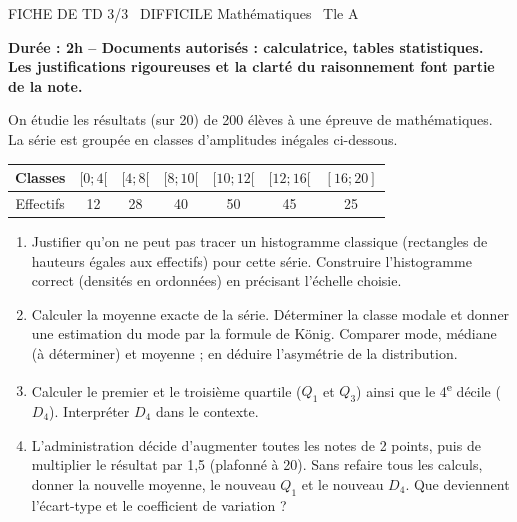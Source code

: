 \documentclass[11pt]{article}
\begin{document}
\begin{tcolorbox}[enhanced,colback=popink,colframe=popink,arc=10pt,boxrule=0pt,left=12pt,right=12pt,top=9pt,bottom=9pt]
{\color{white}\popxbold\small FICHE DE TD 3/3 \textbullet\ DIFFICILE \hfill Mathématiques \textbullet\ Tle A\par}
\end{tcolorbox}
\vspace{4pt}
\textbf{Durée : 2h -- Documents autorisés : calculatrice, tables statistiques. Les justifications rigoureuses et la clarté du raisonnement font partie de la note.}

\begin{exercice}
On étudie les résultats (sur 20) de 200 élèves à une épreuve de mathématiques. La série est groupée en classes d'amplitudes inégales ci-dessous.
\begin{center}
\begin{tabular}{|c|c|c|c|c|c|c|}
\hline
Classes & $[0; 4[$ & $[4; 8[$ & $[8; 10[$ & $[10; 12[$ & $[12; 16[$ & $[16; 20]$ \\
\hline
Effectifs & 12 & 28 & 40 & 50 & 45 & 25 \\
\hline
\end{tabular}
\end{center}
\begin{enumerate}
    \item Justifier qu'on ne peut pas tracer un histogramme classique (rectangles de hauteurs égales aux effectifs) pour cette série. Construire l'histogramme correct (densités en ordonnées) en précisant l'échelle choisie.
    \item Calculer la moyenne exacte de la série. Déterminer la classe modale et donner une estimation du mode par la formule de König. Comparer mode, médiane (à déterminer) et moyenne ; en déduire l'asymétrie de la distribution.
    \item Calculer le premier et le troisième quartile ($Q_1$ et $Q_3$) ainsi que le 4\textsuperscript{e} décile ($D_4$). Interpréter $D_4$ dans le contexte.
    \item L'administration décide d'augmenter toutes les notes de 2 points, puis de multiplier le résultat par 1,5 (plafonné à 20). Sans refaire tous les calculs, donner la nouvelle moyenne, le nouveau $Q_1$ et le nouveau $D_4$. Que deviennent l'écart-type et le coefficient de variation ?
\end{enumerate}
\end{exercice}
\end{document}
